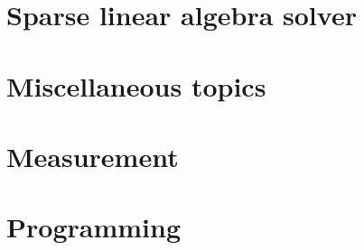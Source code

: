 \documentclass[3pt]{ctexart}
\begin{document}


\clearpage

\section{\label{sec:solver}Sparse linear algebra solver}














\clearpage

\section{\label{sec:Miscellaneous}Miscellaneous topics}





\clearpage

\section{\label{sec:GaugeFixing}Measurement}











%





\clearpage

\section{\label{sec:Programming}Programming}
\end{document}
